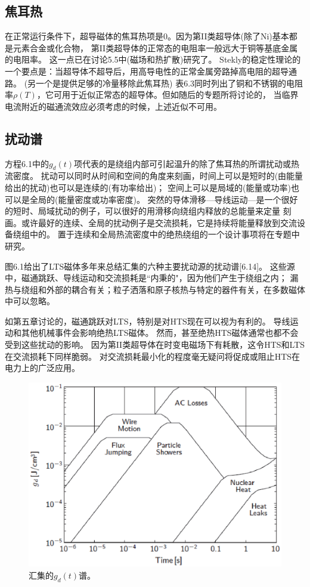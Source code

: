 \subsection{焦耳热}
在正常运行条件下，超导磁体的焦耳热项是0。因为第II类超导体(除了Ni)基本都是元素合金或化合物，
第II类超导体的正常态的电阻率一般远大于铜等基底金属的电阻率。
这一点已在讨论5.5中(磁场和热扩散)研究了。
Stekly的稳定性理论的一个要点是：当超导体不超导后，用高导电性的正常金属旁路掉高电阻的超导通路。
(另一个是提供足够的冷量移除此焦耳热)
表6.3同时列出了铜和不锈钢的电阻率$\rho(T)$，它可用于近似正常态的超导体。但如随后的专题所将讨论的，
当临界电流附近的磁通流效应必须考虑的时候，上述近似不可用。

\subsection{扰动谱}
方程6.1中的$g_d(t)$项代表的是绕组内部可引起温升的除了焦耳热的所谓扰动或热流密度。
扰动可以同时从时间和空间的角度来刻画，时间上可以是短时的(由能量给出的扰动)也可以是连续的(有功率给出)；
空间上可以是局域的(能量或功率)也可以是全局的(能量密度或功率密度)。
突然的导体滑移---导线运动---是一个很好的短时、局域扰动的例子，可以很好的用滑移向绕组内释放的总能量来定量
刻画。或许最好的连续、全局的扰动例子是交流损耗，它是持续将能量释放到交流设备绕组中的。
置于连续和全局热流密度中的绝热绕组的一个设计事项将在专题中研究。

图6.1给出了LTS磁体多年来总结汇集的六种主要扰动源的扰动谱[6.14]。
这些源中，磁通跳跃、导线运动和交流损耗是``内秉的"，因为他们产生于绕组之内；
漏热与绕组和外部的耦合有关；粒子洒落和原子核热与特定的器件有关，在多数磁体中可以忽略。

如第五章讨论的，磁通跳跃对LTS，特别是对HTS现在可以视为有利的。
导线运动和其他机械事件会影响绝热LTS磁体。
然而，甚至绝热HTS磁体通常也都不会受到这些扰动的影响。
因为第II类超导体在时变电磁场下有耗散，这令HTS和LTS在交流损耗下同样脆弱。
对交流损耗最小化的程度毫无疑问将促成或阻止HTS在电力上的广泛应用。

\begin{figure}[htbp]
	\centering
	\includegraphics[scale=0.7]{chpt6/figs/fig6.1.eps}
	\caption{汇集的$g_d(t)$谱。}
\end{figure}

